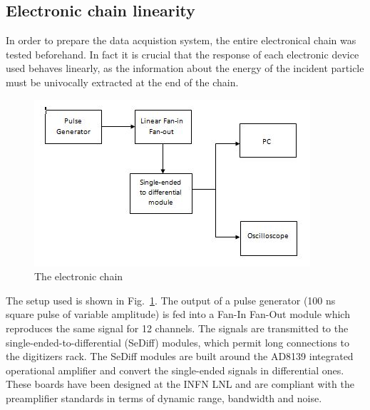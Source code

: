  \subsection{Electronic chain linearity}

In order to prepare the data acquistion system, the entire electronical chain
was tested beforehand. In fact it is crucial that the response of each
electronic device used behaves linearly, as the information about the energy
of the incident particle must be univocally extracted at the end of the chain.

\bigbreak

\begin{figure}[h]
  \centering
  \includegraphics[scale=.6]{img/electronic_chain_diagram.JPG}
  \caption{The electronic chain}
  \label{chain}
\end{figure}

\bigbreak

The setup used is shown in Fig.~\ref{chain}. The output of a pulse generator (\num{100} ns square pulse of variable amplitude) is fed into a Fan-In Fan-Out module which reproduces the same signal for 12 channels. The signals are transmitted
to the single-ended-to-differential (SeDiff) modules, which permit long
connections to the digitizers rack. The SeDiff modules are built around the
AD8139 integrated operational amplifier and convert the single-ended signals
in differential ones. These boards have been designed at the INFN LNL and are
compliant with the preamplifier standards in terms of dynamic range, bandwidth
and noise.

\bigbreak



\bigbreak

